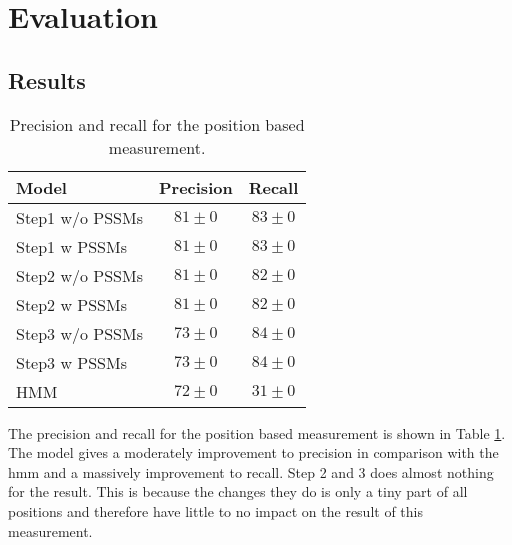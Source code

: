 \section{Evaluation}

\subsection{Results}

\begin{table}
	\centering 
	\begin{tabular}{l|c|c}
		Model & Precision & Recall \\ \hline
		Step1 w/o PSSMs & $81 \pm 0$ & $83 \pm 0$ \\
		Step1 w PSSMs & $81 \pm 0$ & $83 \pm 0$ \\
		Step2 w/o PSSMs & $81 \pm 0$ & $82 \pm 0$ \\
		Step2 w PSSMs & $81 \pm 0$ & $82 \pm 0$ \\
		Step3 w/o PSSMs & $73 \pm 0$ & $84 \pm 0$ \\
		Step3 w PSSMs & $73 \pm 0$ & $84 \pm 0$ \\
		HMM & $72 \pm 0$ & $31 \pm 0$ \\
	\end{tabular}
	\caption{Precision and recall for the position based measurement.}
	\label{tab:char}
\end{table}

The precision and recall for the position based measurement is shown in 
Table \ref{tab:char}. The model gives a moderately improvement to precision
in comparison with the \gls{hmm} and a massively improvement to recall.
Step 2 and 3 does almost nothing for the result. This is because the changes
they do is only a tiny part of all positions and therefore have little to 
no impact on the result of this measurement. 

